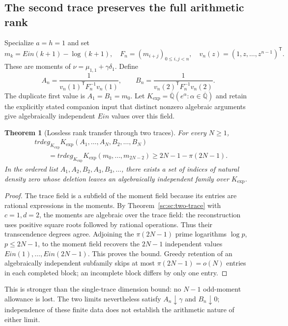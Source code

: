 \documentclass[11pt,a4paper]{article}
\newtheorem{theorem}{Theorem}[section]
\theoremstyle{definition}
\theoremstyle{remark}
\theoremstyle{plain}
\numberwithin{equation}{section}
\def\operatorname#1{#1}\def\mathrm#1{#1}}
\begin{document}
\subsection{The second trace preserves the full arithmetic rank}

Specialize $a=h=1$ and set
\[
 m_k=\operatorname{Ein}(k+1)-\log(k+1),\quad
 F_n=(m_{i+j})_{0\le i,j<n},\quad
 v_n(z)=(1,z,\ldots,z^{n-1})^{\mathsf T}.
\]
These are moments of $\nu=\mu_{1,1}+\gamma\delta_1$. Define
\[
 A_n=\frac1{v_n(1)^{\mathsf T}F_n^{-1}v_n(1)},\qquad
 B_n=\frac1{v_n(2)^{\mathsf T}F_n^{-1}v_n(2)}.
\]
The duplicate first value is $A_1=B_1=m_0$.
Let $K_{\exp}=\overline{\mathbb Q}(e^\alpha:\alpha\in
\overline{\mathbb Q})$ and retain the explicitly stated companion input
that distinct nonzero algebraic arguments give algebraically independent
$\operatorname{Ein}$ values over this field.

\begin{theorem}[Lossless rank transfer through two traces]
\label{sc:sc:arithmetic-rank}
For every $N\ge1$,
\begin{align*}
 &\operatorname{trdeg}_{K_{\exp}}
 K_{\exp}(A_1,\ldots,A_N,B_2,\ldots,B_N)\\
 &\qquad=\operatorname{trdeg}_{K_{\exp}}
 K_{\exp}(m_0,\ldots,m_{2N-2})
 \ge2N-1-\pi(2N-1).
\end{align*}
In the ordered list $A_1,A_2,B_2,A_3,B_3,\ldots$, there exists a set of
indices of natural density zero whose deletion leaves an algebraically
independent family over $K_{\exp}$.
\end{theorem}
\begin{proof}
The trace field is a subfield of the moment field because its entries
are rational expressions in the moments. By Theorem~\ref{sc:sc:two-trace}
with $c=1,d=2$, the moments are algebraic over the trace field: the
reconstruction uses positive square roots followed by rational
operations. Thus their transcendence degrees agree. Adjoining the
$\pi(2N-1)$ prime logarithms $\log p$, $p\le2N-1$, to the moment
field recovers the $2N-1$ independent values
$\operatorname{Ein}(1),\ldots,\operatorname{Ein}(2N-1)$.
This proves the bound. Greedy retention of an algebraically independent
subfamily skips at most $\pi(2N-1)=o(N)$ entries in each completed block;
an incomplete block differs by only one entry.
\end{proof}

This is stronger than the single-trace dimension bound: no $N-1$
odd-moment allowance is lost. The two limits nevertheless satisfy
$A_n\downarrow\gamma$ and $B_n\downarrow0$; independence of these finite
data does not establish the arithmetic nature of either limit.
\end{document}
